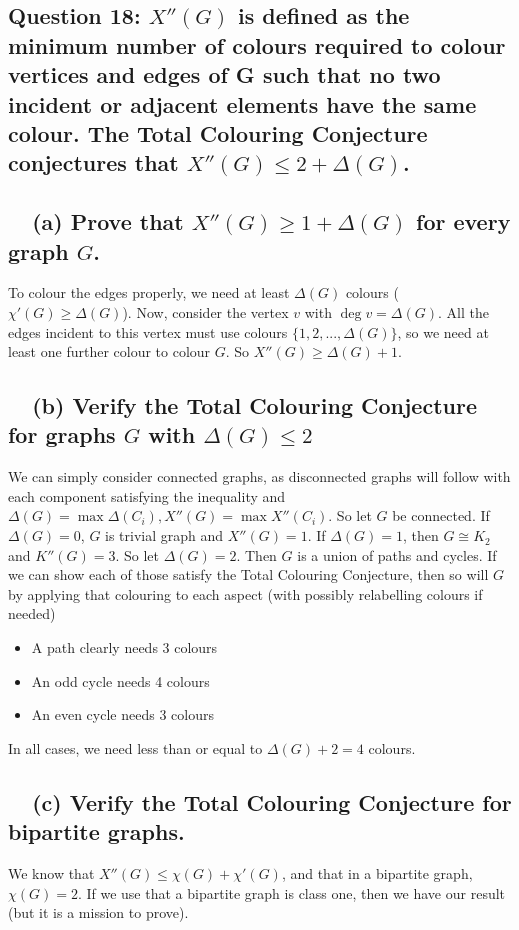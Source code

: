 \documentclass[letterpaper, 11pt]{article}
\newcommand{\1}{\mathds{1}}	%
\theoremstyle{definition}
\begin{document}
\subsection*{Question 18: $X''(G)$ is defined as the minimum number of colours required to colour vertices and
edges of G such that no two incident or adjacent elements have the same colour. The Total Colouring Conjecture conjectures that $X''(G) \le 2 + \Delta (G)$.}
\subsection*{\ \ (a) Prove that $X''(G) \ge 1 + \Delta (G)$ for every graph $G$.}
To colour the edges properly, we need at least $\Delta (G)$ colours ($\chi ' (G) \ge \Delta (G)$). Now, consider the vertex $v$ with $\deg v = \Delta (G)$. All the edges incident to this vertex must use colours $\{1,2,..., \Delta (G)\}$, so we need at least one further colour to colour $G$. So $X''(G) \ge \Delta (G) + 1$.

\subsection*{\ \ (b) Verify the Total Colouring Conjecture for graphs $G$ with $\Delta (G) \le 2$}
We can simply consider connected graphs, as disconnected graphs will follow with each component satisfying the inequality and $\Delta (G) = \max \Delta (C_i), X''(G) = \max X''(C_i)$. So let $G$ be connected. If $\Delta (G) = 0$, $G$ is trivial graph and $X''(G) = 1$. If $\Delta (G) = 1$, then $G \cong K_2$ and $K''(G) = 3$. So let $\Delta (G) = 2$. Then $G$ is a union of paths and cycles. If we can show each of those satisfy the Total Colouring Conjecture, then so will $G$ by applying that colouring to each aspect (with possibly relabelling colours if needed)
\begin{itemize}
\item A path clearly needs 3 colours
\item An odd cycle needs 4 colours
\item An even cycle needs 3 colours
\end{itemize}
In all cases, we need less than or equal to $\Delta (G) + 2 = 4$ colours.

\subsection*{\ \ (c) Verify the Total Colouring Conjecture for bipartite graphs.}
We know that $X''(G) \le \chi (G) + \chi '(G)$, and that in a bipartite graph, $\chi (G) = 2$. If we use that a bipartite graph is class one, then we have our result (but it is a mission to prove). 
\end{document}
